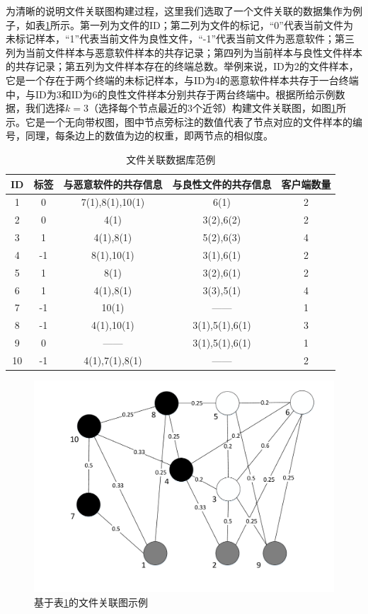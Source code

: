 为清晰的说明文件关联图构建过程，这里我们选取了一个文件关联的数据集作为例子，如表\ref{tb_dataSample}所示。第一列为文件的ID；第二列为文件的标记，``0''代表当前文件为未标记样本，``1''代表当前文件为良性文件，``-1''代表当前文件为恶意软件；第三列为当前文件样本与恶意软件样本的共存记录；第四列为当前样本与良性文件样本的共存记录；第五列为文件样本存在的终端总数。举例来说，ID为2的文件样本，它是一个存在于两个终端的未标记样本，与ID为4的恶意软件样本共存于一台终端中，与ID为3和ID为6的良性文件样本分别共存于两台终端中。根据所给示例数据，我们选择$k=3$（选择每个节点最近的3个近邻）构建文件关联图，如图\ref{fig:SampleGraph}所示。它是一个无向带权图，图中节点旁标注的数值代表了节点对应的文件样本的编号，同理，每条边上的数值为边的权重，即两节点的相似度。
\begin{table}[!ht]
\caption{文件关联数据库范例}
\label{tb_dataSample}
\centering
\begin{tabular}{ccccc}

\toprule
ID & 标签 & 与恶意软件的共存信息 & 与良性文件的共存信息 & 客户端数量\\
\midrule
1 & 0 & 7(1),8(1),10(1) & 6(1) & 2\\
2 & 0 & 4(1) & 3(2),6(2) & 2\\
3 & 1 & 4(1),8(1) & 5(2),6(3) & 4\\
4 & -1 & 8(1),10(1) & 3(1),6(1) & 2\\
5 & 1 & 8(1) & 3(2),6(1) & 2\\
6 & 1 & 4(1),8(1) & 3(3),5(1) & 4\\
7 & -1 & 10(1) & ------ & 1\\
8 & -1 & 4(1),10(1) & 3(1),5(1),6(1) & 3\\
9 & 0 & ------ & 3(1),5(1),6(1) & 1\\
10 & -1 & 4(1),7(1),8(1) & ------ & 2\\
\bottomrule
\end{tabular}
\end{table}

\begin{figure}[!t]
\centering
\includegraphics[width=4.5in]{img/chap2/SampleGraph.pdf}
\caption{基于表\ref{tb_dataSample}的文件关联图示例}
\label{fig:SampleGraph}
\end{figure}

